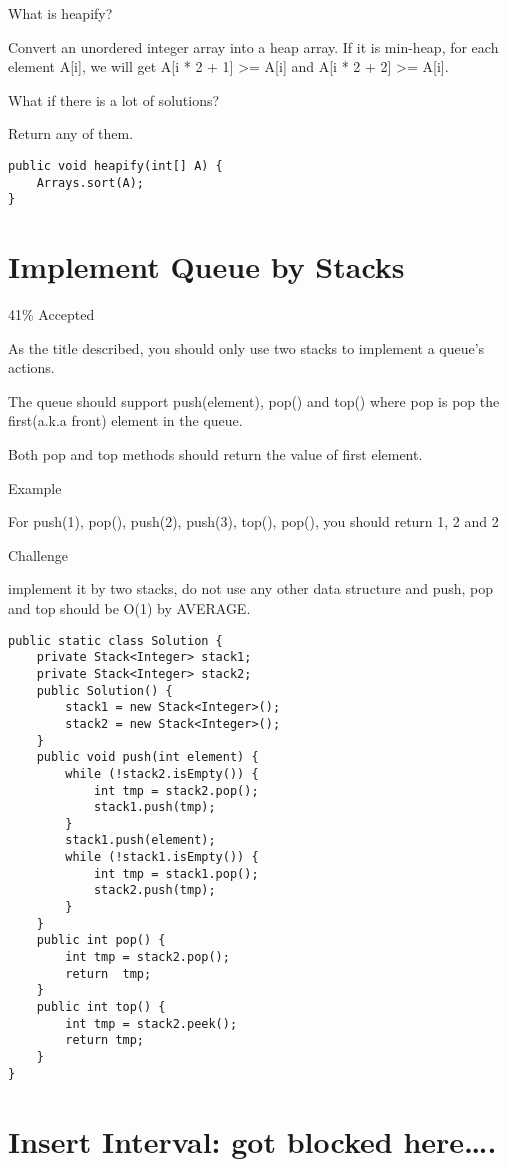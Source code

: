\documentclass[12pt]{book}
\begin{document}
What is heapify?

Convert an unordered integer array into a heap array. If it is min-heap, for each element A[i], we will get A[i * 2 + 1] >= A[i] and A[i * 2 + 2] >= A[i].

What if there is a lot of solutions?

Return any of them.
\lstset{language=java,label= ,caption= ,numbers=none}
\begin{lstlisting}
public void heapify(int[] A) {
    Arrays.sort(A);
}
\end{lstlisting}
\chapter{Implement Queue by Stacks}
\label{sec-31}

41\% Accepted

As the title described, you should only use two stacks to implement a queue's actions.

The queue should support push(element), pop() and top() where pop is pop the first(a.k.a front) element in the queue.

Both pop and top methods should return the value of first element.

Example

For push(1), pop(), push(2), push(3), top(), pop(), you should return 1, 2 and 2

Challenge

implement it by two stacks, do not use any other data structure and
push, pop and top should be O(1) by AVERAGE.
\lstset{language=java,label= ,caption= ,numbers=none}
\begin{lstlisting}
public static class Solution {
    private Stack<Integer> stack1;
    private Stack<Integer> stack2;
    public Solution() {
        stack1 = new Stack<Integer>();
        stack2 = new Stack<Integer>();
    }
    public void push(int element) {
        while (!stack2.isEmpty()) {
            int tmp = stack2.pop();
            stack1.push(tmp);
        }
        stack1.push(element);
        while (!stack1.isEmpty()) {
            int tmp = stack1.pop();
            stack2.push(tmp);
        }
    }
    public int pop() {
        int tmp = stack2.pop();
        return  tmp;
    }
    public int top() {
        int tmp = stack2.peek();
        return tmp;
    }
}
\end{lstlisting}
\chapter{Insert Interval: got blocked here\ldots{}.}
\label{sec-32}
\end{document}
